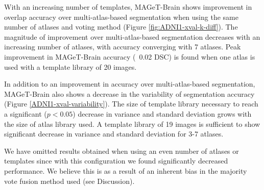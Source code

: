 \documentclass{article}\usepackage{graphicx, color}
\newcommand{\mb}{MAGeT-Brain }
\begin{document}
With an increasing number of templates, \mb shows improvement in overlap
accuracy over multi-atlas-based segmentation when using the same number of atlases
and voting method (Figure \ref{fig:ADNI1-xval-k-diff}). The magnitude of improvement over
multi-atlas-based segmentation decreases with an increasing number of atlases,
with accuracy converging with 7 atlases.  Peak improvement in \mb accuracy (~0.02
DSC) is found when one atlas is used with a template library of 20 images.

In addition to an improvement in accuracy over multi-atlas-based segmentation,
\mb also shows a decrease in the variability of segmentation accuracy 
(Figure \ref{ADNI1-xval-variability}).  The size of template library 
necessary to reach a significant ($p < 0.05$) decrease in variance and standard 
deviation grows with the size of atlas library used.  A template library of 19
images is sufficient to show significant decrease in variance and standard 
deviation for 3-7 atlases. 

We have omitted results obtained when using an even number of atlases or
templates since with this configuration we found significantly decreased
performance. We believe this is as a result of an inherent bias in the majority
vote fusion method used (see Discussion).  



\end{document}
